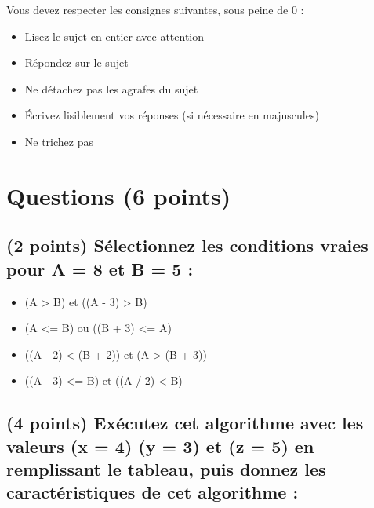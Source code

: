 \documentclass[11pt,a4paper]{article}
\begin{document}
\MakeExamTitle                   %


\bigskip

Vous devez respecter les consignes suivantes, sous peine de 0 :

\begin{itemize}
\item Lisez le sujet en entier avec attention
\item Répondez sur le sujet
\item Ne détachez pas les agrafes du sujet
\item \'Ecrivez lisiblement vos réponses (si nécessaire en majuscules)
\item Ne trichez pas
\end{itemize}



\section{Questions (6 points)}

\subsection{(2 points) Sélectionnez les conditions vraies pour A = 8 et B = 5 : }

\bigskip

\begin{itemize}
  \item[\CaseCoche] (A > B) et ((A - 3) > B)  %
  \item[\CaseCoche] (A <= B) ou ((B + 3) <= A)  %
  \item[\CaseCoche] ((A - 2) < (B + 2)) et (A > (B + 3))  %
  \item[\CaseCoche] ((A - 3) <= B) et ((A / 2) < B)  %
\end{itemize}


\medskip


\subsection{(4 points) Exécutez cet algorithme avec les valeurs (x = 4) (y = 3) et (z = 5) en remplissant le tableau, puis donnez les caractéristiques de cet algorithme : }
\end{document}
